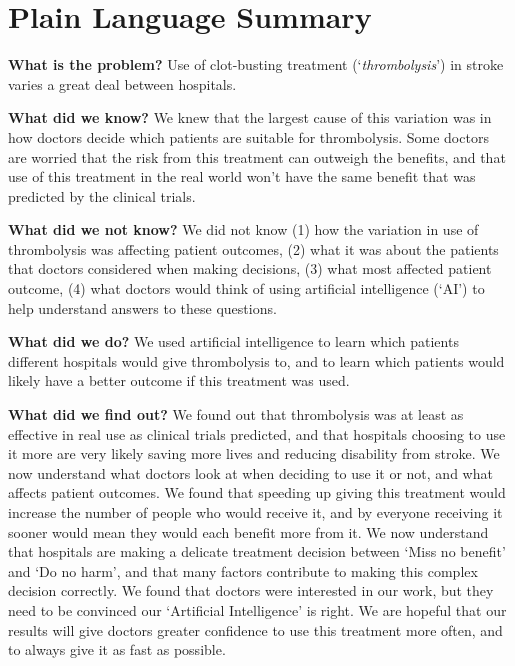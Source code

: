 \section*{Plain Language Summary}

\textbf{What is the problem?} Use of clot-busting treatment (`\textit{thrombolysis}') in stroke varies a great deal between hospitals.

\textbf{What did we know?} We knew that the largest cause of this variation was in how doctors decide which patients are suitable for thrombolysis. Some doctors are worried that the risk from this treatment can outweigh the benefits, and that use of this treatment in the real world won’t have the same benefit that was predicted by the clinical trials.

\textbf{What did we not know?} We did not know (1) how the variation in use of thrombolysis was affecting patient outcomes, (2) what it was about the patients that doctors considered when making decisions, (3) what most affected patient outcome, (4) what doctors would think of using artificial intelligence (`AI') to help understand answers to these questions.

\textbf{What did we do?} We used artificial intelligence to learn which patients different hospitals would give thrombolysis to, and to learn which patients would likely have a better outcome if this treatment was used.

\textbf{What did we find out?} We found out that thrombolysis was at least as effective in real use as clinical trials predicted, and that hospitals choosing to use it more are very likely saving more lives and reducing disability from stroke. We now understand what doctors look at when deciding to use it or not, and what affects patient outcomes. We found that speeding up giving this treatment would increase the number of people who would receive it, and by everyone receiving it sooner would mean they would each benefit more from it. We now understand that hospitals are making a delicate treatment decision between ‘Miss no benefit’ and ‘Do no harm’, and that many factors contribute to making this complex decision correctly. We found that doctors were interested in our work, but they need to be convinced our ‘Artificial Intelligence’ is right. We are hopeful that our results will give doctors greater confidence to use this treatment more often, and to always give it as fast as possible.